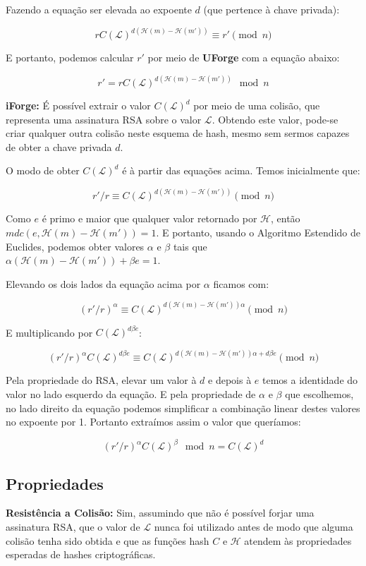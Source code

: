 \documentclass[a4paper]{article}
\begin{document}
Fazendo a equação ser elevada ao expoente $d$ (que pertence à chave
privada):

$$
rC(\mathcal{L})^{d(\mathcal{H}(m)-\mathcal{H}(m'))} \equiv r' \pmod n
$$

E portanto, podemos calcular $r'$ por meio de \textbf{UForge} com a
equação abaixo:

$$
r' = rC(\mathcal{L})^{d(\mathcal{H}(m)-\mathcal{H}(m'))} \mod n
$$

\textbf{iForge:} É possível extrair o valor $C(\mathcal{L})^d$ por
meio de uma colisão, que representa uma assinatura RSA sobre o valor
$\mathcal{L}$. Obtendo este valor, pode-se criar qualquer outra
colisão neste esquema de hash, mesmo sem sermos capazes de obter a
chave privada $d$.

O modo de obter $C(\mathcal{L})^d$ é à partir das equações
acima. Temos inicialmente que:

$$
r'/r \equiv C(\mathcal{L})^{d(\mathcal{H}(m)-\mathcal{H}(m'))} \pmod n
$$

Como $e$ é primo e maior que qualquer valor retornado por
$\mathcal{H}$, então $mdc(e, \mathcal{H}(m)-\mathcal{H}(m')) = 1$. E
portanto, usando o Algoritmo Estendido de Euclides, podemos obter
valores $\alpha$ e $\beta$ tais que
$\alpha(\mathcal{H}(m)-\mathcal{H}(m'))+\beta e = 1$.

Elevando os dois lados da equação acima por $\alpha$ ficamos com:

$$
(r'/r)^\alpha \equiv C(\mathcal{L})^{d(\mathcal{H}(m)-\mathcal{H}(m'))\alpha} \pmod n
$$

E multiplicando por $C(\mathcal{L})^{d\beta e}$:

$$
(r'/r)^\alpha C(\mathcal{L})^{d\beta e} \equiv C(\mathcal{L})^{d(\mathcal{H}(m)-\mathcal{H}(m'))\alpha + d\beta e} \pmod n
$$

Pela propriedade do RSA, elevar um valor à $d$ e depois à $e$ temos a
identidade do valor no lado esquerdo da equação. E pela propriedade de
$\alpha$ e $\beta$ que escolhemos, no lado direito da equação podemos
simplificar a combinação linear destes valores no expoente por
1. Portanto extraímos assim o valor que queríamos:

$$
(r'/r)^\alpha C(\mathcal{L})^{\beta} \mod n= C(\mathcal{L})^d
$$

\subsection{Propriedades}

\textbf{Resistência a Colisão: }Sim, assumindo que não é possível
forjar uma assinatura RSA, que o valor de $\mathcal{L}$ nunca foi
utilizado antes de modo que alguma colisão tenha sido obtida e que as
funções hash $C$ e $\mathcal{H}$ atendem às propriedades esperadas de
hashes criptográficas.
\end{document}
